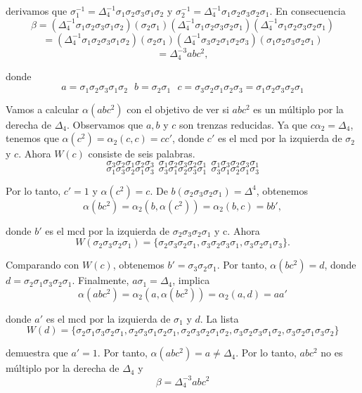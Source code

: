 \documentclass[12pt]{article}
\theoremstyle{definition}
\begin{document}
derivamos que $\sigma_1^{-1}=\Delta_4^{-1}\sigma_1\sigma_2\sigma_3\sigma_1\sigma_2$ y $\sigma_2^{-1}=\Delta_4^{-1}\sigma_1\sigma_2\sigma_3\sigma_2\sigma_1$. En consecuencia
$$\beta=(\Delta_4^{-1}\sigma_1\sigma_2\sigma_3\sigma_1\sigma_2)(\sigma_2\sigma_1)(\Delta_4^{-1}\sigma_1\sigma_2\sigma_3\sigma_2\sigma_1)(\Delta_4^{-1}\sigma_1\sigma_2\sigma_3\sigma_2\sigma_1)$$
$$=(\Delta_4^{-1}\sigma_1\sigma_2\sigma_3\sigma_1\sigma_2)(\sigma_2\sigma_1)(\Delta_4^{-1}\sigma_3\sigma_2\sigma_1\sigma_2\sigma_3)(\sigma_1\sigma_2\sigma_3\sigma_2\sigma_1)$$
$$=\Delta_4^{-3}abc^2,$$

donde
$$a=\sigma_1\sigma_2\sigma_3\sigma_1\sigma_2\ \ \ b=\sigma_2\sigma_1\ \ \ c=\sigma_3\sigma_2\sigma_1\sigma_2\sigma_3=\sigma_1\sigma_2\sigma_3\sigma_2\sigma_1$$

Vamos a calcular $\alpha(abc^2)$ con el objetivo de ver si $abc^2$ es un múltiplo por la derecha de $\Delta_4$. Observamos que $a,b$ y $c$ son trenzas reducidas. Ya que $c\alpha_2=\Delta_4$, tenemos que $\alpha(c^2)=\alpha_2(c,c)=cc'$, donde $c'$ es el mcd por la izquierda de $\sigma_2$ y $c$. Ahora $W(c)$ consiste de seis palabras.
$$\sigma_3\sigma_2\sigma_1\sigma_2\sigma_3\ \ \sigma_1\sigma_2\sigma_3\sigma_2\sigma_1\ \ \sigma_1\sigma_3\sigma_2\sigma_3\sigma_1$$
$$\sigma_1\sigma_3\sigma_2\sigma_1\sigma_3\ \ \sigma_3\sigma_1\sigma_2\sigma_3\sigma_1\ \ \sigma_3\sigma_1\sigma_2\sigma_1\sigma_3$$

Por lo tanto, $c'=1$ y $\alpha(c^2)=c$. De $b(\sigma_2\sigma_3\sigma_2\sigma_1)=\Delta^4$, obtenemos
$$\alpha(bc^2)=\alpha_2(b,\alpha(c^2))=\alpha_2(b,c)=bb',$$

donde $b'$ es el mcd por la izquierda de $\sigma_2\sigma_3\sigma_2\sigma_1$ y c. Ahora
$$W(\sigma_2\sigma_3\sigma_2\sigma_1)=\{\sigma_2\sigma_3\sigma_2\sigma_1,\sigma_3\sigma_2\sigma_3\sigma_1,\sigma_3\sigma_2\sigma_1\sigma_3\}.$$

Comparando con $W(c)$, obtenemos $b'=\sigma_3\sigma_2\sigma_1$. Por tanto, $\alpha(bc^2)=d$, donde $d=\sigma_2\sigma_1\sigma_3\sigma_2\sigma_1$. Finalmente, $a\sigma_1=\Delta_4$, implica
$$\alpha(abc^2)=\alpha_2(a,\alpha(bc^2))=\alpha_2(a,d)=aa'$$

donde $a'$ es el mcd por la izquierda de $\sigma_1$ y $d$. La lista
$$W(d)=\{\sigma_2\sigma_1\sigma_3\sigma_2\sigma_1,\sigma_2\sigma_3\sigma_1\sigma_2\sigma_1,
\sigma_2\sigma_3\sigma_2\sigma_1\sigma_2,\sigma_3\sigma_2\sigma_3\sigma_1\sigma_2,
\sigma_3\sigma_2\sigma_1\sigma_3\sigma_2\}$$

demuestra que $a'=1$. Por tanto, $\alpha(abc^2)=a\neq\Delta_4$. Por lo tanto, $abc^2$ no es múltiplo por la derecha de $\Delta_4$ y 
$$\beta=\Delta_4^{-3}abc^2$$
\end{document}
